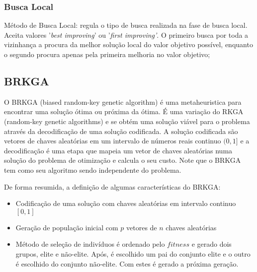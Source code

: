 \documentclass[12pt,a4paper]{article}
\begin{document}
    \subsubsection{Busca Local}

        Método de Busca Local: regula o tipo de busca realizada na fase de busca local. Aceita valores '\textit{best improving}' ou '\textit{first improving'}. O primeiro busca por toda a vizinhança
        a procura da melhor solução local do valor objetivo possível, enquanto o segundo procura apenas pela primeira melhoria no valor objetivo;


        


\subsection{BRKGA}


    O BRKGA (biased random-key genetic algorithm)\cite{gonccalves2011biased} é uma metaheuristica para encontrar uma solução ótima ou próxima da ótima. É uma variação do RKGA
    (random-key genetic algorithms) \cite{bean1994genetic} e se obtém uma solução viável para o problema através da decodificação de uma solução codificada. A solução codificada são vetores de
    chaves aleatórias em um intervalo de números reais continuo $(0,1]$ e a decodificação é uma etapa que mapeia um vetor de chaves aleatórias numa solução do problema de otimização e calcula o
    seu custo. Note que o BRKGA tem como seu algoritmo sendo independente do problema. 

    De forma resumida, a definição de algumas características do BRKGA: 


        \begin{itemize}

        \item Codificação de uma solução com chaves aleatórias em intervalo continuo $[0,1]$ 

        \item Geração de população inicial com $p$ vetores de $n$ chaves aleatórias

        \item Método de seleção de indivíduos é ordenado pelo $fitness$ e gerado dois grupos, elite e não-elite. Após, é escolhido um pai do conjunto elite e o outro é escolhido do conjunto
            não-elite. Com estes é gerado a próxima geração. 

        \end{itemize}
\end{document}

